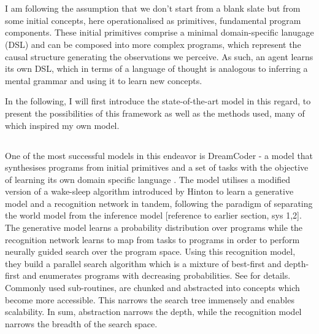 \section{}

I am following the assumption that we don't start from a blank slate but from some initial concepts, here operationalised as primitives, fundamental program components. These initial primitives comprise a minimal domain-specific lanugage (DSL) and can be composed into more complex programs, which represent the causal structure generating the observations we perceive. As such, an agent learns its own DSL, which in terms of a language of thought is analogous to inferring a mental grammar and using it to learn new concepts.

In the following, I will first introduce the state-of-the-art model in this regard, to present the possibilities of this framework as well as the methods used, many of which inspired my own model.

\subsection{}
One of the most successful models in this endeavor is DreamCoder - a model that synthesises programs from initial primitives and a set of tasks with the objective of learning its own domain specific language \cite{ellis_dreamcoder_2021}. The model utilises a modified version of a wake-sleep algorithm introduced by Hinton to learn a generative model and a recognition network in tandem, following the paradigm of separating the world model from the inference model \cite{hinton1995wake} [reference to earlier section, sys 1,2]. The generative model learns a probability distribution over programs while the recognition network learns to map from tasks to programs in order to perform neurally guided search over the program space. Using this recognition model, they build a parallel search algorithm which is a mixture of best-first and depth-first and enumerates programs with decreasing probabilities. See \cite{Ellis_Wong_Nye_Sable-Meyer_Cary_Morales_Hewitt_Solar-Lezama_Tenenbaum} for details.
Commonly used sub-routines, are chunked and abstracted into concepts which become more accessible. This narrows the search tree immensely and enables scalability. In sum, abstraction narrows the depth, while the recognition model narrows the breadth of the search space.

